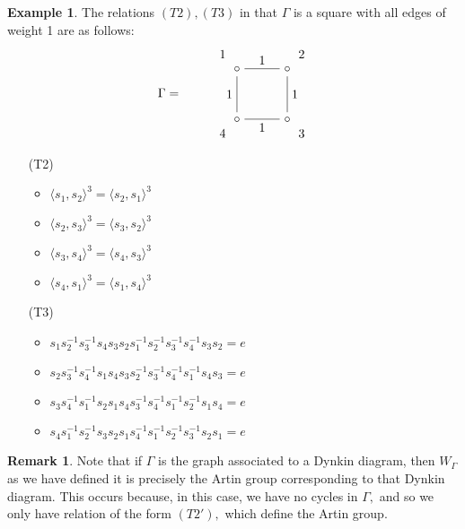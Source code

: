 \documentclass[11pt]{amsart}
\theoremstyle{definition}
\newtheorem{ex}[thm]{Example}
\newtheorem{rem}[thm]{Remark}
\begin{document}
\begin{ex}
The relations $(T2),(T3)$ in that $\Gamma$ is a square with all edges of weight 1 are as follows:
\[\Gamma =\begin{tikzpicture}[baseline=-0.5ex]
\matrix[matrix of math nodes,column sep={40pt,between origins},row
sep={40pt,between origins},nodes={asymmetrical rectangle}] at (6,0)
{
& |[name = ul]|\circ& |[name = ur]|\circ\\
%
&|[name=dl]| \circ &|[name=dr]| \circ \\
};
\draw
(ul) -- node[above] {1} (ur)
;
\draw
(dl) -- node[left]{1}(ul)
;
\draw
(dr) -- node[below]{1}(dl)
;
\draw
(ur) -- node[right]{1} (dr)
;
\node [yshift = .4 cm,xshift = -.4 cm] at (ul){1};
\node [yshift = .4 cm,xshift = .4 cm] at (ur){2};
\node [yshift = -.4 cm,xshift = .4 cm] at (dr){3};
\node [yshift = -.4 cm,xshift = -.4 cm] at (dl){4};
\end{tikzpicture}\]
   \begin{enumerate}
\item[(T2)]
\begin{itemize}
\item $\langle s_1,s_2 \rangle^3 = \langle s_2,s_1 \rangle^3$
\item $\langle s_2,s_3 \rangle^3 = \langle s_3,s_2 \rangle^3$
\item $\langle s_3,s_4 \rangle^3 = \langle s_4,s_3 \rangle^3$
\item $\langle s_4,s_1 \rangle^3 = \langle s_1,s_4 \rangle^3$
\end{itemize}
\item[(T3)]
\begin{itemize}
\item $s_{1}s_{2}^{-1}s_{3}^{-1}s_4s_{3}s_2s_1^{-1}s_2^{-1}s_3^{-1}s_4^{-1}s_3s_2 = e$
\item $s_{2}s_{3}^{-1}s_{4}^{-1}s_1s_{4}s_3s_2^{-1}s_3^{-1}s_4^{-1}s_1^{-1}s_4s_3 = e$
\item $s_{3}s_{4}^{-1}s_{1}^{-1}s_2s_{1}s_4s_3^{-1}s_4^{-1}s_1^{-1}s_2^{-1}s_1s_4 = e$
\item $s_{4}s_{1}^{-1}s_{2}^{-1}s_3s_{2}s_1s_4^{-1}s_1^{-1}s_2^{-1}s_3^{-1}s_2s_1 = e$
\end{itemize}
\end{enumerate}
\end{ex}




\begin{rem}
Note that if $\Gamma$ is the graph associated to a Dynkin diagram, then $W_\Gamma$ as we have defined it is precisely the Artin group corresponding to that Dynkin diagram. This occurs because, in this case, we have no cycles in $\Gamma,$ and so we only have relation of the form $(T2'),$ which define the Artin group.
\end{rem}
\end{document}

